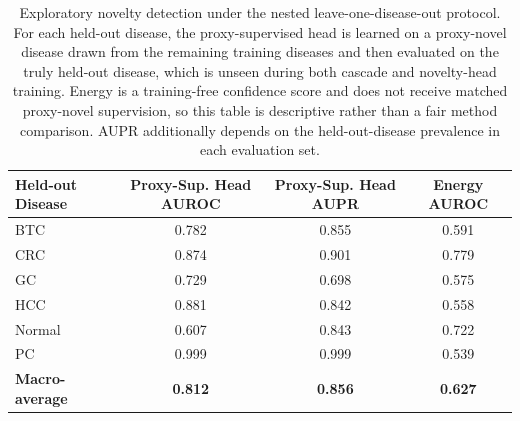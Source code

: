 \begin{table}[t]
\centering
\small
\setlength{\tabcolsep}{6pt}
\renewcommand{\arraystretch}{1.10}

\begin{tabular}{lccc}
\toprule
\textbf{Held-out Disease} & \textbf{Proxy-Sup. Head AUROC} & \textbf{Proxy-Sup. Head AUPR} & \textbf{Energy AUROC} \\
\midrule

BTC     & 0.782 & 0.855 & 0.591 \\
CRC     & 0.874 & 0.901 & 0.779 \\
GC      & 0.729 & 0.698 & 0.575 \\
HCC     & 0.881 & 0.842 & 0.558 \\
Normal  & 0.607 & 0.843 & 0.722 \\
PC      & 0.999 & 0.999 & 0.539 \\
\midrule
\textbf{Macro-average} & \textbf{0.812} & \textbf{0.856} & \textbf{0.627} \\

\bottomrule
\end{tabular}

\caption{
Exploratory novelty detection under the nested leave-one-disease-out
protocol. For each held-out disease, the proxy-supervised head is learned
on a proxy-novel disease drawn from the remaining training diseases and
then evaluated on the truly held-out disease, which is unseen during both
cascade and novelty-head training. Energy is a training-free confidence
score and does not receive matched proxy-novel supervision, so this table
is descriptive rather than a fair method comparison. AUPR additionally
depends on the held-out-disease prevalence in each evaluation set.
}
\label{tab:novelty}

\end{table}
